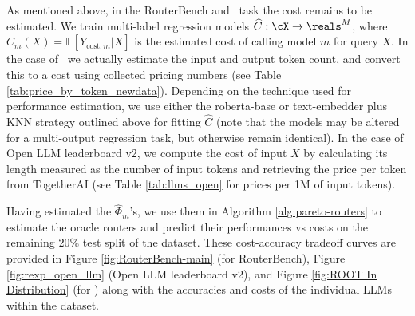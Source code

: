 
As mentioned above, in the RouterBench and \newdata\ task the cost remains to be estimated. We train multi-label regression models $\widehat C: \cX \to \reals^M$, where $\hat{C}_m(X) =\mathbb{E}[Y_{\text{cost}, m}|X]$ is the estimated cost of calling model $m$ for query $X$. In the case of \newdata\ we actually estimate the input and output token count, and convert this to a cost using collected pricing numbers (see Table \ref{tab:price_by_token_newdata}). Depending on the technique used for performance estimation, we use either the {roberta-base} or text-embedder plus KNN strategy outlined above for fitting $\hat{C}$ (note that the models may be altered for a multi-output regression task, but otherwise remain identical).  In the case of Open LLM leaderboard v2, we compute the cost of input $X$ by calculating its length measured as the number of input tokens and retrieving the price per token from TogetherAI (see Table  \ref{tab:llms_open} for prices per 1M of input tokens).

Having estimated the $\widehat \Phi_m$'s, we use them in Algorithm \ref{alg:pareto-routers} to estimate the oracle routers and predict their performances vs costs on the remaining $20\%$ test split of the dataset. These cost-accuracy tradeoff curves are provided in Figure \ref{fig:RouterBench-main} (for RouterBench), Figure  \ref{fig:rexp_open_llm} (Open LLM leaderboard v2), and Figure \ref{fig:ROOT In Distribution} (for \newdata) along with the accuracies and costs of the individual LLMs within the dataset. 



